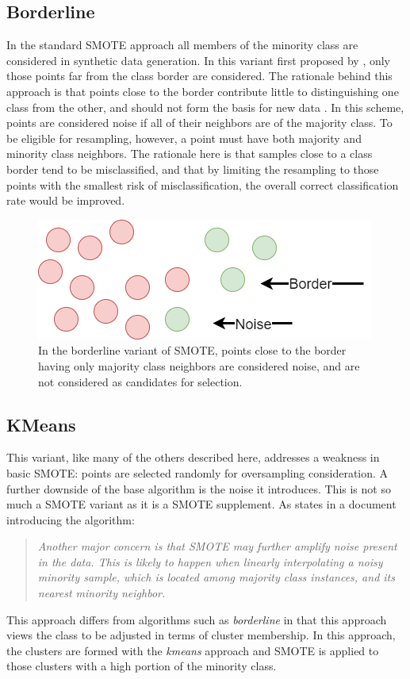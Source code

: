 \documentclass[letterpaper]{article}
\begin{document}
\subsection{Borderline}
In the standard SMOTE approach all members of the minority class are considered in synthetic data generation. In this variant first proposed by \citeauthor{Han2005-ui}, only those points far from the class border are considered. The rationale behind this approach is that points close to the border contribute little to distinguishing one class from the other, and should not form the basis for new data \parencite{Han2005-ui}. In this scheme, points are considered noise if all of their neighbors are of the majority class. To be eligible for resampling, however, a point must have both majority and minority class neighbors. The rationale here is that samples close to a class border tend to be misclassified, and that by limiting the resampling to those points with the smallest risk of misclassification, the overall correct classification rate would be improved.
\begin{figure}[H]
	\centering
	\includegraphics[scale=0.30]{./figures/borderline.png}
	\caption[Borderline selection of synthetic data points]{In the borderline variant of SMOTE, points close to the border having only majority class neighbors are considered noise, and are not considered as candidates for selection.}
	\label{fig:borderline}
\end{figure}



\subsection{KMeans}
This variant, like many of the others described here, addresses a weakness in basic SMOTE: points are selected randomly for oversampling consideration. A further downside of the base algorithm is the noise it introduces. This is not so much a SMOTE variant as it is a SMOTE supplement. As \citeauthor{Last2017-rh} states in a document introducing the algorithm:
\begin{quote}
\textit{
Another major concern is that SMOTE may further amplify noise present in the data. This is likely
to happen when linearly interpolating a noisy minority sample, which is located among majority class
instances, and its nearest minority neighbor. \parencite{Last2017-rh}
}
\end{quote}
This approach differs from algorithms such as \textit{borderline} in that this approach views the class to be adjusted in terms of cluster membership.  In this approach, the clusters are formed with the \textit{kmeans} approach and SMOTE is applied to those clusters with a high portion of the minority class.
\end{document}

